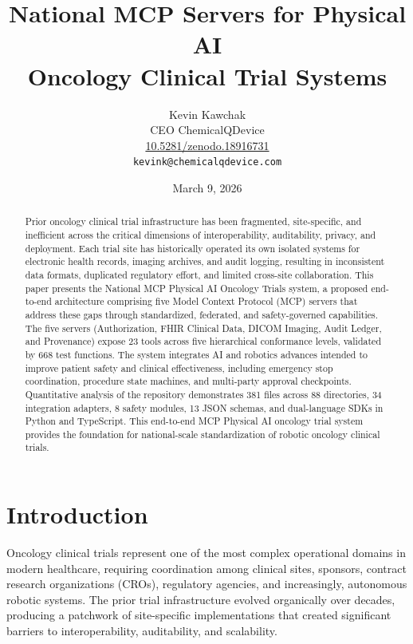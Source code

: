 \documentclass{article}
\title{National MCP Servers for Physical AI\\Oncology Clinical Trial Systems}
\author{
  Kevin Kawchak\hspace{2pt}\orcidicon{0009-0007-5457-8667} \\
  CEO ChemicalQDevice\\
  \href{https://doi.org/10.5281/zenodo.18916731}{10.5281/zenodo.18916731} \\
  \texttt{kevink@chemicalqdevice.com}
}
\date{March 9, 2026}
\begin{document}
\maketitle

\begin{abstract}
Prior oncology clinical trial infrastructure has been fragmented, site-specific, and inefficient across the critical dimensions of interoperability, auditability, privacy, and deployment. Each trial site has historically operated its own isolated systems for electronic health records, imaging archives, and audit logging, resulting in inconsistent data formats, duplicated regulatory effort, and limited cross-site collaboration. This paper presents the National MCP Physical AI Oncology Trials system, a proposed end-to-end architecture comprising five Model Context Protocol (MCP) servers that address these gaps through standardized, federated, and safety-governed capabilities. The five servers (Authorization, FHIR Clinical Data, DICOM Imaging, Audit Ledger, and Provenance) expose 23 tools across five hierarchical conformance levels, validated by 668 test functions. The system integrates AI and robotics advances intended to improve patient safety and clinical effectiveness, including emergency stop coordination, procedure state machines, and multi-party approval checkpoints. Quantitative analysis of the repository demonstrates 381 files across 88 directories, 34 integration adapters, 8 safety modules, 13 JSON schemas, and dual-language SDKs in Python and TypeScript. This end-to-end MCP Physical AI oncology trial system provides the foundation for national-scale standardization of robotic oncology clinical trials.
\end{abstract}




\section{Introduction}
\label{sec:introduction}

\vspace{-0.2cm}

Oncology clinical trials represent one of the most complex operational domains in modern healthcare, requiring coordination among clinical sites, sponsors, contract research organizations (CROs), regulatory agencies, and increasingly, autonomous robotic systems. The prior trial infrastructure evolved organically over decades, producing a patchwork of site-specific implementations that created significant barriers to interoperability, auditability, and scalability.
\end{document}
